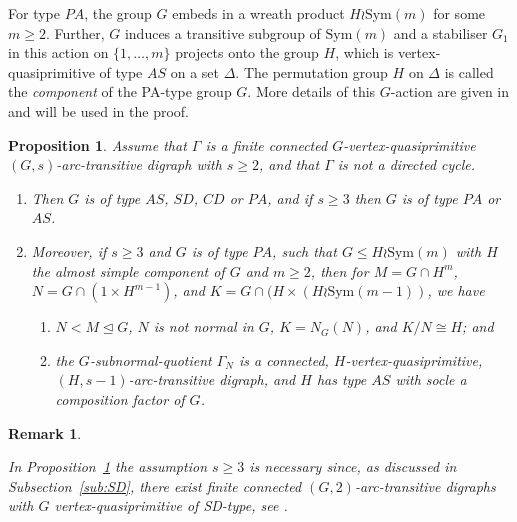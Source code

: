 \documentclass[11pt]{amsart}
\newtheorem{proposition}[theorem]{Proposition}
\newtheorem{remark}[theorem]{Remark}
\newcommand{\Sym}{\mathrm{Sym}}
\begin{document}
For type \(PA\), the group $G$ embeds in a wreath product $H\wr \Sym(m)$ for some $m\geq2$. Further, $G$ induces a transitive subgroup of $\Sym(m)$ and a stabiliser $G_1$ in this action on $\{1,\dots,m\}$ projects onto the group $H$, which is vertex-quasiprimitive  of type $AS$ on a set $\Delta$. The permutation group $H$ on $\Delta$ is called the \emph{component} of the PA-type group $G$.  More details of this $G$-action are given in \cite[Section 5]{BCC97} and will be used in the proof.





\begin{proposition}\label{p:pa}
 Assume that \(\Gamma\) is a finite connected \(G\)-vertex-quasiprimitive \((G,s)\)-arc-transitive digraph with \(s\geqslant2\), and that \(\Gamma\) is not a directed cycle. 
 \begin{enumerate}
     \item[(a)]  Then \(G\) is of type \(AS\), \(SD\), \(CD\) or \(PA\), and if $s\geqslant3$ then $G$ is of type \(PA\) or \(AS\). 
     \item[(b)] Moreover, if $s\geqslant3$ and \(G\) is of type \(PA\), such that \(G\leqslant H\wr\Sym(m)\) with \(H\) the almost simple component of $G$ and $m\geqslant2$, then for
     $M=G\cap H^m$, $N= G\cap (1\times H^{m-1})$, and $K=G\cap (H\times (H\wr\Sym(m-1))$, we have
     \begin{enumerate}
         \item[(i)] $N<M\unlhd G$, $N$ is not normal in $G$, $K=N_G(N)$, and $K/N\cong H$;  and 
         \item[(ii)] the \(G\)-subnormal-quotient \(\Gamma_{N}\)  is a connected,  $H$-vertex-quasiprimitive, \((H,s-1)\)-arc-transitive digraph, and \(H\) has type \(AS\) with socle a composition factor of $G$. 
     \end{enumerate}
 \end{enumerate}
\end{proposition}

\begin{remark}\label{r:pa}
{\rm 
    In Proposition~\ref{p:pa} the assumption $s\geqslant 3$ is necessary since, as discussed in Subsection~\ref{sub:SD}, there exist finite connected  \((G,2)\)-arc-transitive digraphs with $G$ vertex-quasiprimitive of SD-type, see \cite[Theorem 1.2]{quasi}.%
    
    }
\end{remark}
\end{document}
